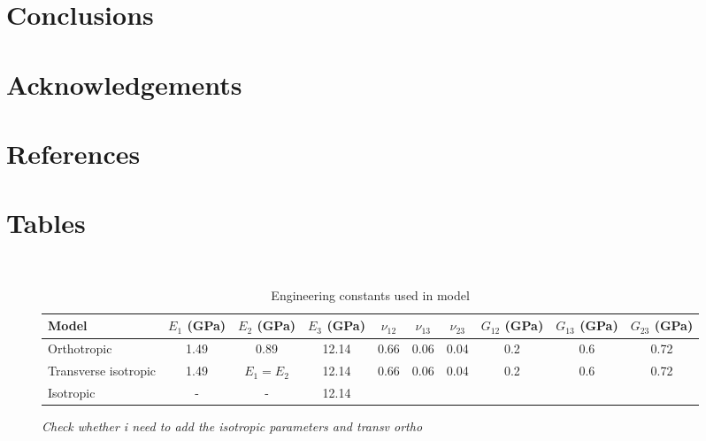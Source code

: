 \documentclass[review]{elsarticle}
\begin{document}
\section{Conclusions}

\section*{Acknowledgements}

\section*{References}


\pagebreak

\section*{Tables}

\begin{description}

\item[]
\begin{table}[ht]\
\caption{Engineering constants used in model} %
\centering %
\begin{tabular}{l c c c c c c c c c} %
\hline\hline %
Model & $E_{1}$ (GPa) & $E_{2}$ (GPa) & $E_{3}$ (GPa) & $\nu_{12}$ & $\nu_{13}$
& $\nu_{23}$ & $G_{12}$ (GPa) & $G_{13}$ (GPa) & $G_{23}$ (GPa) \\ %

\hline %
Orthotropic & 1.49 & 0.89 & 12.14 & 0.66 & 0.06 & 0.04 & 0.2 & 0.6 & 0.72 \\
Transverse isotropic & 1.49 & $E_1=E_2$ & 12.14 & 0.66 & 0.06 & 0.04 & 0.2 &
 0.6 & 0.72\\
Isotropic & - & - & 12.14 \\
 [1ex] %
\hline %
\end{tabular}
\label{table:nonlin} %
\end{table}

\it{\color{red}Check whether i need to add the isotropic parameters and transv
ortho}

\end{description}



\pagebreak


\end{document}
